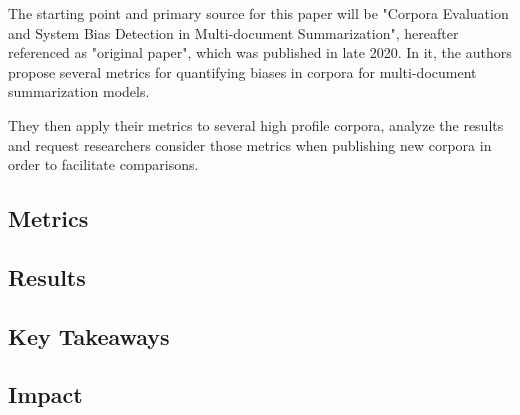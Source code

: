 \documentclass[../main.tex]{subfiles}
\begin{document}
The starting point and primary source for this paper will be
"Corpora Evaluation and System Bias Detection in Multi-document Summarization"\cite{dey-etal-2020-corpora}, hereafter referenced as "original paper", which was published in late 2020.
In it, the authors propose several metrics for quantifying biases in corpora for multi-document summarization models.

They then apply their metrics to several high profile corpora, analyze the results and request researchers consider those metrics when publishing new corpora in order to facilitate comparisons.

\subsection{Metrics}
\label{sec:metrics}


\subsection{Results}
\label{sec:results}


\subsection{Key Takeaways}
\label{sec:takewawys}


\subsection{Impact}
\label{sec:impact}

\end{document}
